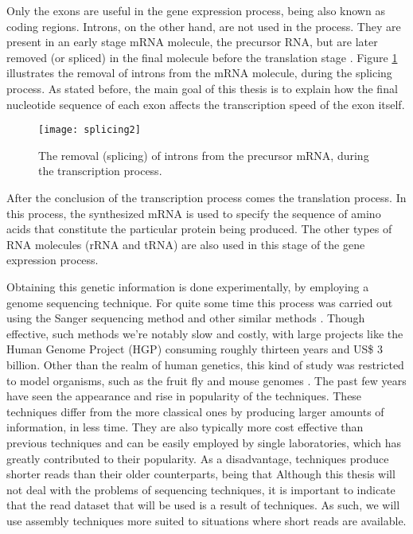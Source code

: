 Only the exons are useful in the gene expression process, being also known as
coding regions. Introns, on the other hand, are not used in the process. They
are present in an early stage mRNA molecule, the precursor RNA, but are later
removed (or spliced) in the final molecule before the translation stage
\cite{leic:gene_expr}. Figure \ref{fig:splicing} illustrates the removal of
introns from the mRNA molecule, during the  splicing process. As stated before,
the main goal of this thesis is to explain how the final nucleotide sequence of
each exon affects the transcription speed of the exon itself.

\begin{figure}[!htb]
  \begin{center}
    \leavevmode
    \texttt{[image: splicing2]}
    \caption[Removal of introns from precursor mRNA]{The removal (splicing) of introns from the precursor mRNA, during
    the transcription process.}
    \label{fig:splicing}
  \end{center}
\end{figure}

After the conclusion of the transcription process comes the translation process.
In this process, the synthesized mRNA is used to specify the sequence of amino
acids that constitute the particular protein being produced. The other types of
RNA molecules (rRNA and tRNA) are also used in this stage of the gene expression
process.

Obtaining this genetic information is done experimentally, by employing a genome
sequencing technique. For quite some time this process was carried out using the
Sanger sequencing method and other similar methods \cite{Reis-Filho2009}. Though
effective, such methods we're notably slow and costly, with large projects like
the Human Genome Project (HGP) consuming roughly thirteen years and US\$ 3
billion. Other than the realm of human genetics, this kind of study was
restricted to model organisms, such as the fruit fly and mouse genomes
\cite{Wolf2013}. The past few years have seen the appearance and rise in
popularity of the \ngs{} techniques. These techniques differ from the more
classical ones by producing larger amounts of information, in less time. They
are also typically more cost effective than previous techniques and can be
easily employed by single laboratories, which has greatly contributed to their
popularity. As a disadvantage, \ngs{} techniques produce shorter reads than
their older counterparts, being that 
\cite[p. 671]{Martin2011} Although this thesis will not deal with the problems
of sequencing techniques, it is important to indicate that the read dataset that
will be used is a result of \ngs{} techniques. As such, we will use assembly
techniques more suited to situations where short reads are available.

